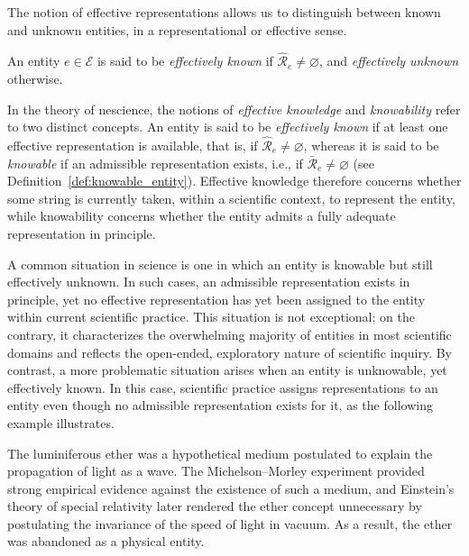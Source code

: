The notion of effective representations allows us to distinguish between known and unknown entities, in a representational or effective sense.

\begin{definition}
\label{def:unknown_entity}
An entity $e \in \mathcal{E}$ is said to be \emph{effectively known} if $\hat{\mathcal{R}}_e \ne \varnothing$, and \emph{effectively unknown} otherwise.
\end{definition}

In the theory of nescience, the notions of \emph{effective knowledge} and \emph{knowability} refer to two distinct concepts. An entity is said to be \emph{effectively known} if at least one effective representation is available, that is, if $\hat{\mathcal{R}}_e \neq \varnothing$, whereas it is said to be \emph{knowable} if an admissible representation exists, i.e., if $\bar{\mathcal{R}}_e \neq \varnothing$ (see Definition~\ref{def:knowable_entity}). Effective knowledge therefore concerns whether some string is currently taken, within a scientific context, to represent the entity, while knowability concerns whether the entity admits a fully adequate representation in principle.

A common situation in science is one in which an entity is knowable but still effectively unknown. In such cases, an admissible representation exists in principle, yet no effective representation has yet been assigned to the entity within current scientific practice. This situation is not exceptional; on the contrary, it characterizes the overwhelming majority of entities in most scientific domains and reflects the open-ended, exploratory nature of scientific inquiry. By contrast, a more problematic situation arises when an entity is unknowable, yet effectively known. In this case, scientific practice assigns representations to an entity even though no admissible representation exists for it, as the following example illustrates.

\begin{example}
\label{ex:luminiferous_ether}
The luminiferous ether was a hypothetical medium postulated to explain the propagation of light as a wave. The Michelson--Morley experiment provided strong empirical evidence against the existence of such a medium, and Einstein's theory of special relativity later rendered the ether concept unnecessary by postulating the invariance of the speed of light in vacuum. As a result, the ether was abandoned as a physical entity.
\end{example}

